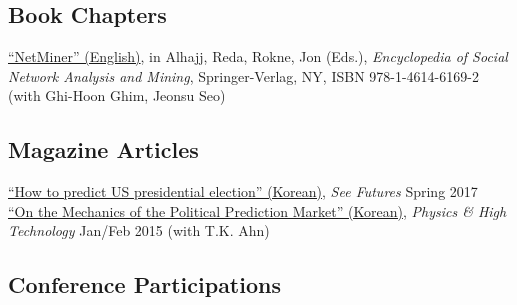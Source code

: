 \documentclass[11pt, a4paper]{article} %
\newcommand{\years}[1]{\marginnote{\scriptsize #1}} %
\begin{document}


\subsection*{Book Chapters}

\years{2014} \href{http://www.springer.com/us/book/9781461461692}{``NetMiner'' (English)}, in Alhajj, Reda, Rokne, Jon (Eds.), \textit{Encyclopedia of Social Network Analysis and Mining}, Springer-Verlag, NY, ISBN 978-1-4614-6169-2 (with Ghi-Hoon Ghim, Jeonsu Seo)\\


\subsection*{Magazine Articles}

\years{2017}
\href{http://futures.kaist.ac.kr/center05/periodical/view/tableid/periodical/id/384}{``How to predict US presidential election'' (Korean)}, \emph{See Futures} Spring 2017\\
\years{2015} \href{http://webzine.kps.or.kr/contents/data/webzine/webzine/14762088365.pdf}{``On the Mechanics of the Political Prediction Market'' (Korean)}, \emph{Physics \& High Technology} Jan/Feb 2015 (with T.K. Ahn)\\

\subsection*{Conference Participations}
\end{document}
